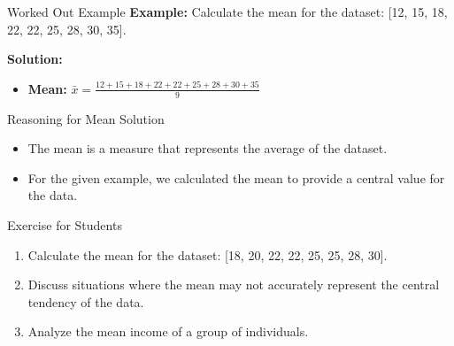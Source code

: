\begin{frame}{Worked Out Example}
  \textbf{Example:} Calculate the mean for the dataset: [12, 15, 18, 22, 22, 25, 28, 30, 35].

  \textbf{Solution:}
  \begin{itemize}
    \item \textbf{Mean:} \( \bar{x} = \frac{12 + 15 + 18 + 22 + 22 + 25 + 28 + 30 + 35}{9} \)
  \end{itemize}
\end{frame}

\begin{frame}{Reasoning for Mean Solution}
  \begin{itemize}
    \item The mean is a measure that represents the average of the dataset.
    \item For the given example, we calculated the mean to provide a central value for the data.
  \end{itemize}
\end{frame}

\begin{frame}{Exercise for Students}
  \begin{enumerate}
    \item Calculate the mean for the dataset: [18, 20, 22, 22, 25, 25, 28, 30].
    \item Discuss situations where the mean may not accurately represent the central tendency of the data.
    \item Analyze the mean income of a group of individuals.
  \end{enumerate}
\end{frame}
